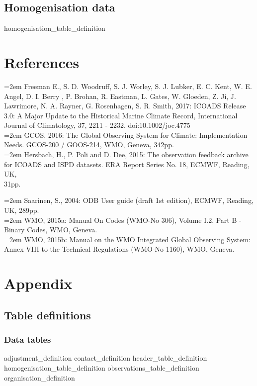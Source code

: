 \documentclass[a4paper,12pt]{article}
\begin{document}
\subsection {Homogenisation data}
 {homogenisation_table_definition}

\section {References}

\hangindent=2em Freeman E., S. D. Woodruff, S. J. Worley, S. J. Lubker, E. C. Kent, W. E. Angel, D. I. Berry , P. Brohan, R. Eastman, L. Gates, W. Gloeden, Z. Ji, J. Lawrimore, N. A. Rayner, G. Rosenhagen, S. R. Smith, 2017: ICOADS Release 3.0: A Major Update to the Historical Marine Climate Record, International Journal of Climatology, 37, 2211 - 2232. doi:10.1002/joc.4775\\

\hangindent=2em GCOS, 2016: The Global Observing System for Climate: Implementation Needs. GCOS-200 / GOOS-214, WMO, Geneva, 342pp.\\

\hangindent=2em Hersbach, H., P. Poli and D. Dee, 2015: The observation feedback archive for ICOADS and ISPD datasets. ERA Report Series No. 18, ECMWF, Reading, UK, \\31pp.

\hangindent=2em Saarinen, S., 2004: ODB User guide (draft 1st edition), ECMWF, Reading, UK, 289pp.\\

\hangindent=2em WMO, 2015a: Manual On Codes (WMO-No 306), Volume I.2, Part B - Binary Codes, WMO, Geneva.\\

\hangindent=2em WMO, 2015b:  Manual on the WMO Integrated Global Observing System: Annex VIII to the Technical Regulations (WMO-No 1160), WMO, Geneva.\\
\newpage
\section {Appendix}
\subsection {Table definitions}

\subsubsection {Data tables}
 {adjustment_definition} %
 {contact_definition} %
 {header_table_definition} %
 {homogenisation_table_definition}
 {observations_table_definition}
 {organisation_definition} 
\end{document}
